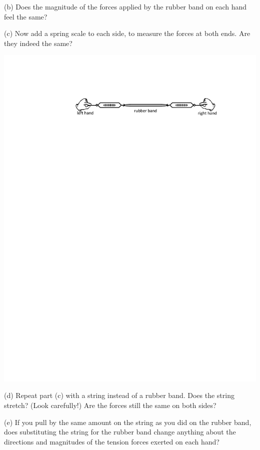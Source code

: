 (b) Does the magnitude of the forces applied by the rubber band on each hand
feel the same?
\answerspace{20mm}

(c) Now add a spring scale to each side, to measure the forces at both ends.  Are they indeed the same?

{\par\centering \includegraphics{newton/hands_plus_scales.pdf} \par}
\answerspace{20mm}

(d) Repeat part (c) with a string instead of a rubber band. 
Does the string stretch? (Look carefully!)  Are the forces still the same on both sides?
\answerspace{20mm}

(e) If you pull by the same amount on the string as you did on the rubber band,
does substituting the string for the rubber band change anything about the directions
and magnitudes of the tension forces exerted on each hand? 
\answerspace{10mm}

